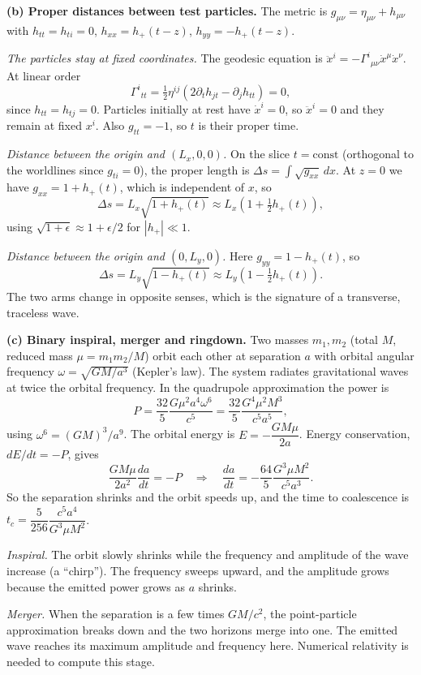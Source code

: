 \documentclass[12pt]{article}
\begin{document}
\textbf{(b) Proper distances between test particles.} The metric is $g_{\mu\nu}=\eta_{\mu\nu}+h_{\mu\nu}$ with $h_{tt}=h_{t i}=0$, $h_{xx}=h_+(t-z)$, $h_{yy}=-h_+(t-z)$.

\emph{The particles stay at fixed coordinates.} The geodesic equation is $\ddot x^i=-\Gamma^i{}_{\mu\nu}\dot x^\mu\dot x^\nu$. At linear order
\[
\Gamma^i{}_{tt}=\tfrac12\eta^{ij}\left(2\partial_t h_{jt}-\partial_j h_{tt}\right)=0,
\]
since $h_{tt}=h_{tj}=0$. Particles initially at rest have $\dot x^i=0$, so $\ddot x^i=0$ and they remain at fixed $x^i$. Also $g_{tt}=-1$, so $t$ is their proper time.

\emph{Distance between the origin and $(L_x,0,0)$.} On the slice $t=\text{const}$ (orthogonal to the worldlines since $g_{ti}=0$), the proper length is $\Delta s=\int\sqrt{g_{xx}}\,dx$. At $z=0$ we have $g_{xx}=1+h_+(t)$, which is independent of $x$, so
\[
\Delta s=L_x\sqrt{1+h_+(t)}\approx L_x\left(1+\tfrac12 h_+(t)\right),
\]
using $\sqrt{1+\epsilon}\approx1+\epsilon/2$ for $|h_+|\ll1$.

\emph{Distance between the origin and $(0,L_y,0)$.} Here $g_{yy}=1-h_+(t)$, so
\[
\Delta s=L_y\sqrt{1-h_+(t)}\approx L_y\left(1-\tfrac12 h_+(t)\right).
\]
The two arms change in opposite senses, which is the signature of a transverse, traceless wave.

\textbf{(c) Binary inspiral, merger and ringdown.} Two masses $m_1,m_2$ (total $M$, reduced mass $\mu=m_1m_2/M$) orbit each other at separation $a$ with orbital angular frequency $\omega=\sqrt{GM/a^3}$ (Kepler's law). The system radiates gravitational waves at twice the orbital frequency. In the quadrupole approximation the power is
\[
P=\frac{32}{5}\frac{G\mu^2a^4\omega^6}{c^5}=\frac{32}{5}\frac{G^4\mu^2M^3}{c^5a^5},
\]
using $\omega^6=(GM)^3/a^9$. The orbital energy is $E=-\dfrac{GM\mu}{2a}$. Energy conservation, $dE/dt=-P$, gives
\[
\frac{GM\mu}{2a^2}\frac{da}{dt}=-P\quad\Rightarrow\quad \frac{da}{dt}=-\frac{64}{5}\frac{G^3\mu M^2}{c^5a^3}.
\]
So the separation shrinks and the orbit speeds up, and the time to coalescence is $t_c=\dfrac{5}{256}\dfrac{c^5a^4}{G^3\mu M^2}$.

\emph{Inspiral.} The orbit slowly shrinks while the frequency and amplitude of the wave increase (a ``chirp''). The frequency sweeps upward, and the amplitude grows because the emitted power grows as $a$ shrinks.

\emph{Merger.} When the separation is a few times $GM/c^2$, the point-particle approximation breaks down and the two horizons merge into one. The emitted wave reaches its maximum amplitude and frequency here. Numerical relativity is needed to compute this stage.
\end{document}
